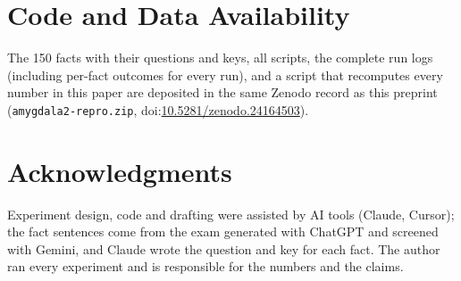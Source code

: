 \documentclass[11pt,a4paper]{article}
\begin{document}
\section*{Code and Data Availability}
The 150 facts with their questions and keys, all scripts, the complete run logs (including per-fact outcomes for every run), and a script that recomputes every number in this paper are deposited in the same Zenodo record as this preprint (\texttt{amygdala2-repro.zip}, doi:\href{https://doi.org/10.5281/zenodo.24164503}{10.5281/zenodo.24164503}).

\section*{Acknowledgments}
Experiment design, code and drafting were assisted by AI tools (Claude, Cursor); the fact sentences come from the exam generated with ChatGPT and screened with Gemini, and Claude wrote the question and key for each fact. The author ran every experiment and is responsible for the numbers and the claims.
\end{document}
